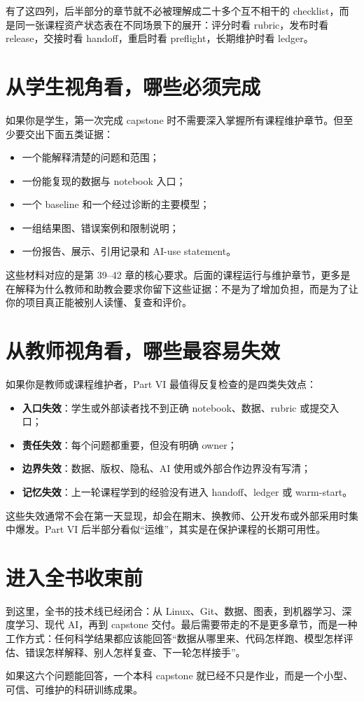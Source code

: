 有了这四列，后半部分的章节就不必被理解成二十多个互不相干的 checklist，而是同一张课程资产状态表在不同场景下的展开：评分时看 rubric，发布时看 release，交接时看 handoff，重启时看 preflight，长期维护时看 ledger。

\section*{从学生视角看，哪些必须完成}

如果你是学生，第一次完成 capstone 时不需要深入掌握所有课程维护章节。但至少要交出下面五类证据：

\begin{itemize}
    \item 一个能解释清楚的问题和范围；
    \item 一份能复现的数据与 notebook 入口；
    \item 一个 baseline 和一个经过诊断的主要模型；
    \item 一组结果图、错误案例和限制说明；
    \item 一份报告、展示、引用记录和 AI-use statement。
\end{itemize}

这些材料对应的是第 39--42 章的核心要求。后面的课程运行与维护章节，更多是在解释为什么教师和助教会要求你留下这些证据：不是为了增加负担，而是为了让你的项目真正能被别人读懂、复查和评价。

\section*{从教师视角看，哪些最容易失效}

如果你是教师或课程维护者，Part VI 最值得反复检查的是四类失效点：

\begin{itemize}
    \item \textbf{入口失效}：学生或外部读者找不到正确 notebook、数据、rubric 或提交入口；
    \item \textbf{责任失效}：每个问题都重要，但没有明确 owner；
    \item \textbf{边界失效}：数据、版权、隐私、AI 使用或外部合作边界没有写清；
    \item \textbf{记忆失效}：上一轮课程学到的经验没有进入 handoff、ledger 或 warm-start。
\end{itemize}

这些失效通常不会在第一天显现，却会在期末、换教师、公开发布或外部采用时集中爆发。Part VI 后半部分看似“运维”，其实是在保护课程的长期可用性。

\section*{进入全书收束前}

到这里，全书的技术线已经闭合：从 Linux、Git、数据、图表，到机器学习、深度学习、现代 AI，再到 capstone 交付。最后需要带走的不是更多章节，而是一种工作方式：任何科学结果都应该能回答“数据从哪里来、代码怎样跑、模型怎样评估、错误怎样解释、别人怎样复查、下一轮怎样接手”。

如果这六个问题能回答，一个本科 capstone 就已经不只是作业，而是一个小型、可信、可维护的科研训练成果。
